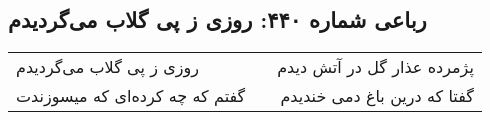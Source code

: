 \begin{center}
\section*{رباعی شماره ۴۴۰: روزی ز پی گلاب می‌گردیدم}
\label{sec:sh440}
\begin{longtable}{l p{0.5cm} r}
روزی ز پی گلاب می‌گردیدم
&&
پژمرده عذار گل در آتش دیدم
\\
گفتم که چه کرده‌ای که میسوزندت
&&
گفتا که درین باغ دمی خندیدم
\\
\end{longtable}
\end{center}
